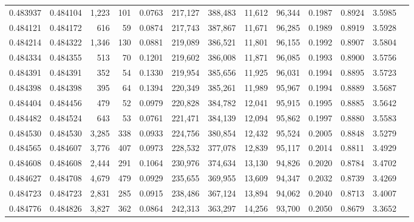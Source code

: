 \begin{tabular}{rrrrrrrrrrrrr}
0.483937 & 0.484104 & 1,223 &   101 &                                     0.0763 & 217,127 & 388,483 &  11,612 &  96,344 & 0.1987 & 0.8924 & 3.5985 \\
0.484121 & 0.484172 &   616 &    59 &                                     0.0874 & 217,743 & 387,867 &  11,671 &  96,285 & 0.1989 & 0.8919 & 3.5928 \\
0.484214 & 0.484322 & 1,346 &   130 &                                     0.0881 & 219,089 & 386,521 &  11,801 &  96,155 & 0.1992 & 0.8907 & 3.5804 \\
0.484334 & 0.484355 &   513 &    70 &                                     0.1201 & 219,602 & 386,008 &  11,871 &  96,085 & 0.1993 & 0.8900 & 3.5756 \\
0.484391 & 0.484391 &   352 &    54 &                                     0.1330 & 219,954 & 385,656 &  11,925 &  96,031 & 0.1994 & 0.8895 & 3.5723 \\
0.484398 & 0.484398 &   395 &    64 &                                     0.1394 & 220,349 & 385,261 &  11,989 &  95,967 & 0.1994 & 0.8889 & 3.5687 \\
0.484404 & 0.484456 &   479 &    52 &                                     0.0979 & 220,828 & 384,782 &  12,041 &  95,915 & 0.1995 & 0.8885 & 3.5642 \\
0.484482 & 0.484524 &   643 &    53 &                                     0.0761 & 221,471 & 384,139 &  12,094 &  95,862 & 0.1997 & 0.8880 & 3.5583 \\
0.484530 & 0.484530 & 3,285 &   338 &                                     0.0933 & 224,756 & 380,854 &  12,432 &  95,524 & 0.2005 & 0.8848 & 3.5279 \\
0.484565 & 0.484607 & 3,776 &   407 &                                     0.0973 & 228,532 & 377,078 &  12,839 &  95,117 & 0.2014 & 0.8811 & 3.4929 \\
0.484608 & 0.484608 & 2,444 &   291 &                                     0.1064 & 230,976 & 374,634 &  13,130 &  94,826 & 0.2020 & 0.8784 & 3.4702 \\
0.484627 & 0.484708 & 4,679 &   479 &                                     0.0929 & 235,655 & 369,955 &  13,609 &  94,347 & 0.2032 & 0.8739 & 3.4269 \\
0.484723 & 0.484723 & 2,831 &   285 &                                     0.0915 & 238,486 & 367,124 &  13,894 &  94,062 & 0.2040 & 0.8713 & 3.4007 \\
0.484776 & 0.484826 & 3,827 &   362 &                                     0.0864 & 242,313 & 363,297 &  14,256 &  93,700 & 0.2050 & 0.8679 & 3.3652 \\

\end{tabular}
